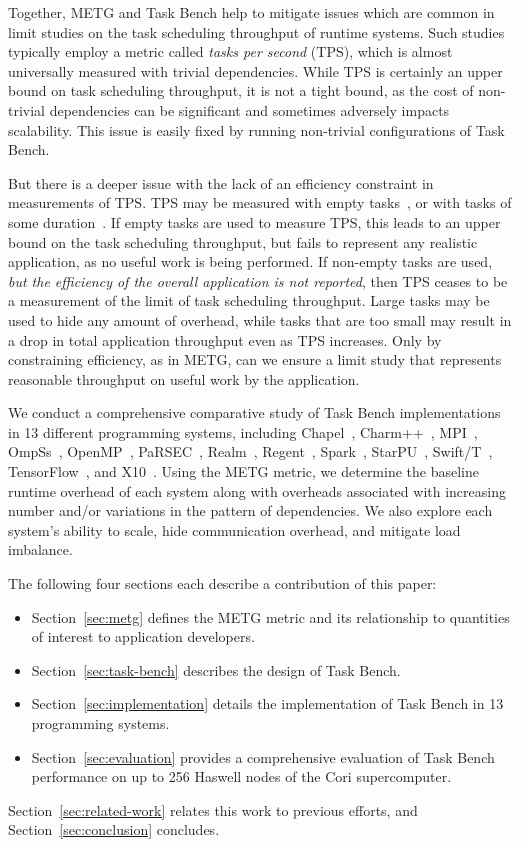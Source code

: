 Together, METG and Task Bench help to mitigate issues which are common
in limit studies on the task scheduling throughput of runtime
systems. Such studies typically employ a metric called \emph{tasks per
  second} (TPS), which is almost universally measured with trivial
dependencies. While TPS is certainly an upper bound on
task scheduling throughput, it is not a tight bound, as the cost of
non-trivial dependencies can be significant and sometimes adversely
impacts scalability. This issue is easily fixed by running non-trivial
configurations of Task Bench.

But there is a deeper issue with the lack of an efficiency constraint
in measurements of TPS. TPS may be measured with empty
tasks~\cite{LegionTracing18}, or with tasks of some
duration~\cite{Canary16, Armstrong14}. If empty tasks are used to
measure TPS, this leads to an upper bound on the task scheduling
throughput, but fails to represent any realistic application, as no
useful work is being performed. If non-empty tasks are used, \emph{but
  the efficiency of the overall application is not reported}, then TPS
ceases to be a measurement of the limit of task scheduling
throughput. Large tasks may be used to hide any amount of overhead,
while tasks that are too small may result in a drop in total
application throughput even as TPS increases. Only by constraining
efficiency, as in METG, can we ensure a limit study that represents
reasonable throughput on useful work by the application.

We conduct a comprehensive comparative study of Task Bench
implementations in 13 different programming systems, including
Chapel~\cite{Chapel07}, Charm++~\cite{Charmpp93}, MPI~\cite{MPI},
OmpSs~\cite{OmpSs11}, OpenMP~\cite{OpenMPSpec40},
PaRSEC~\cite{PARSEC13}, Realm~\cite{Realm14}, Regent~\cite{Regent15},
Spark~\cite{Spark10}, StarPU~\cite{StarPU11},
Swift/T~\cite{Wozniak13}, TensorFlow~\cite{TensorFlow15}, and
X10~\cite{X1005}. Using the METG metric, we determine the baseline
runtime overhead of each system along with overheads associated with
increasing number and/or variations in the pattern of dependencies. We
also explore each system's ability to scale, hide communication
overhead, and mitigate load imbalance.

The following four sections each describe a contribution of this
paper:

\begin{itemize}
\item Section~\ref{sec:metg} defines the METG metric and its
  relationship to quantities of interest to application developers.
\item Section~\ref{sec:task-bench} describes the design of Task Bench.
\item Section~\ref{sec:implementation} details the implementation of
  Task Bench in 13 programming systems.
\item Section~\ref{sec:evaluation} provides a comprehensive evaluation
  of Task Bench performance on up to 256 Haswell nodes of the Cori
  supercomputer.
\end{itemize}

Section~\ref{sec:related-work} relates this work to previous efforts,
and Section~\ref{sec:conclusion} concludes.
